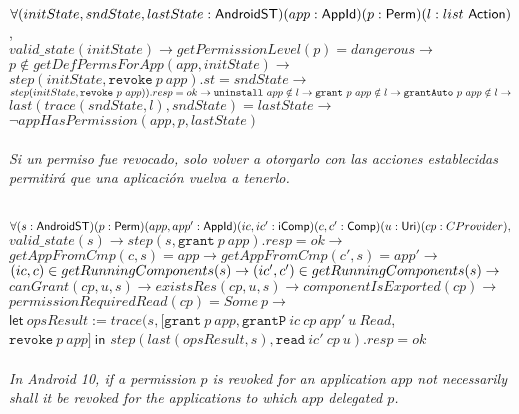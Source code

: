 \begin{prop}
    \mbox{} \\
    $	\forall
        (initState,sndState,lastState:\mathsf{AndroidST})
        (app:\mathsf{AppId})
        (p:\mathsf{Perm})
        (l: list~\mathsf{Action})$, \\
    $	valid\_state(initState) \rightarrow
        getPermissionLevel(p) = dangerous \rightarrow$ \\
    $   p \notin getDefPermsForApp(app,initState) \rightarrow$ \\
    $	step(initState,\texttt{revoke}~p~app).st = sndState \rightarrow$ \\
    $	step(initState, \texttt{revoke}~p~app)).resp=ok \rightarrow \\
        \texttt{uninstall}~app \notin l \rightarrow
        \texttt{grant}~p~app \notin l \rightarrow
        \texttt{grantAuto}~p~app \notin l \rightarrow $\\
    $	last(trace(sndState,l),sndState) = lastState \rightarrow$\\
    $	\neg appHasPermission(app,p,lastState)$ \\ \\
    \textit{Si un permiso fue revocado, solo volver a otorgarlo con las acciones establecidas
        permitirá que una aplicación vuelva a tenerlo.}
\end{prop}

\begin{prop}
    \mbox{} \\
    $	\forall
        (s:\mathsf{AndroidST})
        (p:\mathsf{Perm})
        (app,app':\mathsf{AppId})
        (ic,ic': \mathsf{iComp})
        (c,c':\mathsf{Comp})
        (u:\mathsf{Uri})
        (cp:CProvider), $ \\
    $	valid\_state(s) \rightarrow
        step(s,\texttt{grant}~p~app).resp = ok \rightarrow $ \\
    $	getAppFromCmp(c,s) = app \rightarrow
        getAppFromCmp(c',s) = app' \rightarrow$ \\
    $	(ic, c) \in getRunningComponents(s) \rightarrow \\
        (ic', c') \in getRunningComponents(s) \rightarrow$ \\
    $	canGrant(cp,u,s) \rightarrow
        existsRes(cp,u,s) \rightarrow
        componentIsExported(cp) \rightarrow$ \\
    $	permissionRequiredRead(cp) = Some~p \rightarrow$ \\
    $	\mathsf{let}~opsResult := trace(s,\texttt{[}\texttt{grant}~p~app, \texttt{grantP}~ic~cp~app'~u~Read$,\\
    $ \texttt{revoke}~p~app\texttt{]}~\mathsf{in}$
    $	step(last(opsResult,s), \texttt{read}~ic'~cp~u).resp=ok$ \\ \\
    \textit{In Android 10, if a permission $p$ is revoked for an application $app$ not necessarily shall it be revoked for the applications to which $app$ delegated $p$.}
\end{prop}